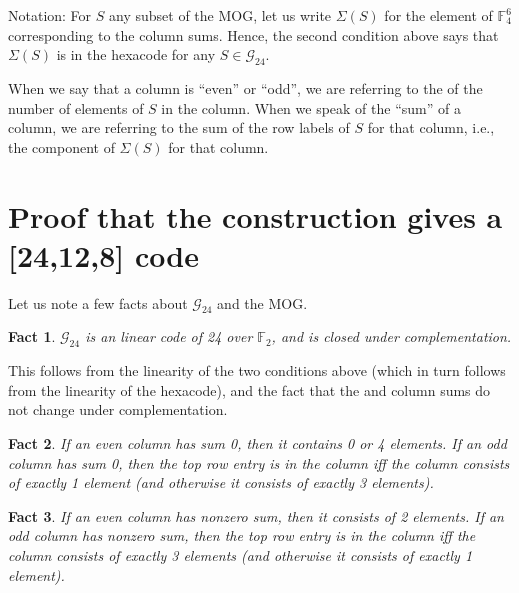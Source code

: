 \documentclass[12pt]{article}
\newcommand{\gc}{\mathcal{G}_{24}}
\newcommand{\F}{\mathbb{F}}
\newtheorem{fact}{Fact}
\begin{document}
Notation: For $S$ any subset of the MOG, let us write $\Sigma(S)$ for the element of $\F_4^6$ corresponding to the column sums.  Hence, the second condition above says that $\Sigma(S)$ is in the hexacode for any $S \in \gc$.

When we say that a column is ``even'' or ``odd'', we are referring to the  of the number of elements of $S$ in the column.  When we speak of the ``sum'' of a column, we are referring to the sum of the row labels of $S$ for that column, i.e., the component of $\Sigma(S)$ for that column.

\section{Proof that the construction gives a [24,12,8] code}

Let us note a few  facts about $\gc$ and the MOG.

\begin{fact}
$\gc$ is an  linear code of  24 over $\F_2$, and is closed under complementation.
\end{fact}
This follows from the linearity of the two conditions above (which in turn follows from the linearity of the hexacode), and the fact that the  and column sums do not change under complementation.

\begin{fact}
If an even column has sum 0, then it contains 0 or 4 elements.  If an odd column has sum 0, then the top row entry is in the column iff the column consists of exactly 1 element (and otherwise it consists of exactly 3 elements).
\end{fact}

\begin{fact}
If an even column has nonzero sum, then it consists of 2 elements.  If an odd column has nonzero sum, then the top row entry is in the column iff the column consists of exactly 3 elements (and otherwise it consists of exactly 1 element).
\end{fact}
\end{document}
